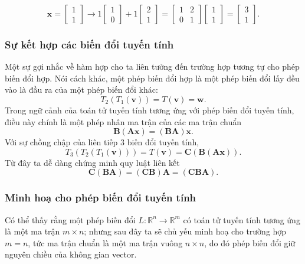 \[\mathbf{x}=\begin{bmatrix}
1\\1
\end{bmatrix}\rightarrow 1\begin{bmatrix}
1\\0
\end{bmatrix}+1\begin{bmatrix}
2\\1
\end{bmatrix}=\begin{bmatrix}
    1&2\\0&1
\end{bmatrix}\begin{bmatrix}
    1\\1
\end{bmatrix}=\begin{bmatrix}
    3\\1
\end{bmatrix}.\]
\subsubsection*{Sự kết hợp các biến đổi tuyến tính}
Một sự gợi nhắc về hàm hợp cho ta liên tưởng đến trường hợp tương tự cho phép biến đổi hợp. Nói cách khác, một phép biến đổi hợp là một phép biến đổi lấy đều vào là đầu ra của một phép biến đổi khác:
\[T_2 (T_1 (\mathbf{v}))=T(\mathbf{v})=\mathbf{w}.\] Trong ngữ cảnh của toán tử tuyến tính tương ứng với phép biến đổi tuyến tính, điều này chính là một phép nhân ma trận của các ma trận chuẩn
\[\mathbf{B}(\mathbf{A}\mathbf{x})=(\mathbf{BA})\mathbf{x}.\]
Với sự chồng chập của liên tiếp 3 biến đổi tuyến tính,
\[T_3 (T_2 (T_1 (\mathbf{v})))=T(\mathbf{v})=\mathbf{C}(\mathbf{B}(\mathbf{A}\mathbf{x})).\] Từ đây ta dễ dàng chứng minh quy luật liên kết
\[\mathbf{C}(\mathbf{BA})=(\mathbf{CB})\mathbf{A}=(\mathbf{C}\mathbf{B}\mathbf{A}).\]
\subsubsection*{Minh hoạ cho phép biến đổi tuyến tính}
Có thể thấy rằng một phép biến đổi \(L: \mathbb{R}^n \rightarrow \mathbb{R}^m\) có toán tử tuyến tính tương ứng là một ma trận \(m\times n\); nhưng
sau đây ta sẽ chủ yếu minh hoạ cho trường hợp \(m=n\), tức ma trận chuẩn là một ma trận vuông \(n\times n\), do đó phép biến đổi giữ nguyên chiều của không gian vector.


